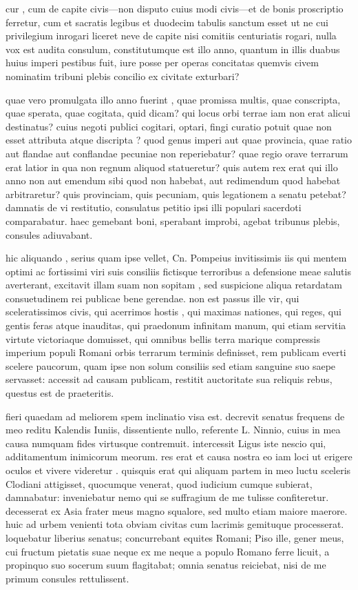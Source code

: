  cur , cum de capite civis—non disputo cuius modi civis—et de bonis proscriptio ferretur, cum et sacratis legibus et duodecim tabulis sanctum esset ut ne cui privilegium inrogari liceret neve de capite nisi comitiis centuriatis rogari, nulla vox est audita consulum, constitutumque est illo anno, quantum in illis duabus huius imperi pestibus fuit, iure posse per operas concitatas quemvis civem nominatim tribuni plebis concilio ex civitate exturbari?

 quae vero promulgata illo anno fuerint , quae promissa multis, quae conscripta, quae sperata, quae cogitata, quid dicam? qui locus orbi terrae iam non erat alicui destinatus? cuius negoti publici cogitari, optari, fingi curatio potuit quae non esset attributa atque discripta ? quod genus imperi aut quae provincia, quae ratio aut flandae aut conflandae pecuniae non reperiebatur? quae regio orave terrarum erat latior in qua non regnum aliquod statueretur? quis autem rex erat qui illo anno non aut emendum sibi quod non habebat, aut redimendum quod habebat arbitraretur? quis provinciam, quis pecuniam, quis legationem a senatu petebat? damnatis de vi restitutio, consulatus petitio ipsi illi populari sacerdoti comparabatur. haec gemebant boni, sperabant improbi, agebat tribunus plebis, consules adiuvabant.

 hic aliquando , serius quam ipse vellet, Cn. Pompeius invitissimis iis qui mentem optimi ac fortissimi viri suis consiliis fictisque terroribus a defensione meae salutis averterant, excitavit illam suam non sopitam , sed suspicione aliqua retardatam consuetudinem rei publicae bene gerendae. non est passus ille vir, qui sceleratissimos civis, qui acerrimos hostis , qui maximas nationes, qui reges, qui gentis feras atque inauditas, qui praedonum infinitam manum, qui etiam servitia virtute victoriaque domuisset, qui omnibus bellis terra marique compressis imperium populi Romani orbis terrarum terminis definisset, rem publicam everti scelere paucorum, quam ipse non solum consiliis sed etiam sanguine suo saepe servasset: accessit ad causam publicam, restitit auctoritate sua reliquis rebus, questus est de praeteritis.

 fieri quaedam ad meliorem spem inclinatio visa est. decrevit senatus frequens de meo reditu Kalendis Iuniis, dissentiente nullo, referente L. Ninnio, cuius in mea causa numquam fides virtusque contremuit. intercessit Ligus iste nescio qui, additamentum inimicorum meorum. res erat et causa nostra eo iam loci ut erigere oculos et vivere videretur . quisquis erat qui aliquam partem in meo luctu sceleris Clodiani attigisset, quocumque venerat, quod iudicium cumque subierat, damnabatur: inveniebatur nemo qui se suffragium de me tulisse confiteretur. decesserat ex Asia frater meus magno squalore, sed multo etiam maiore maerore. huic ad urbem venienti tota obviam civitas cum lacrimis gemituque processerat. loquebatur liberius senatus; concurrebant equites Romani; Piso ille, gener meus, cui fructum pietatis suae neque ex me neque a populo Romano ferre licuit, a propinquo suo socerum suum flagitabat; omnia senatus reiciebat, nisi de me primum consules rettulissent.

